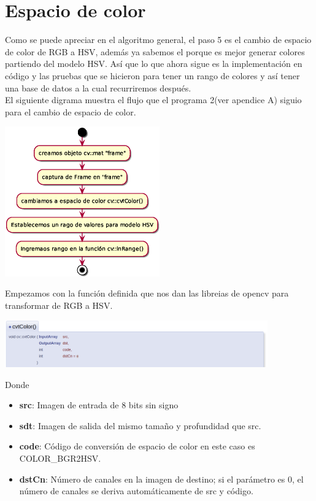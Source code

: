 \section{Espacio de color}
Como se puede apreciar en el algoritmo general, el paso 5 es el cambio de espacio de color
de RGB a HSV, además ya sabemos el porque es mejor generar colores partiendo del
modelo HSV. Así que lo que ahora sigue es la implementación en código y las pruebas
que se hicieron para tener un rango de colores y así tener una base de datos a la
cual recurriremos después.\\
El siguiente digrama muestra el flujo que el programa 2(ver apendice A) siguio para
el cambio de espacio de color.
\begin{center}
	\includegraphics[width=0.5\textwidth]{Contenido/Cuerpo/Capitulo4/color.eps}
	\label{color}
\end{center}
Empezamos con la función definida que nos dan las libreias de opencv para transformar
de RGB a HSV.
\begin{center}
	\includegraphics[width=0.85\textwidth]{Contenido/Cuerpo/Capitulo4/Fig2.eps}
	\label{Fig2}
\end{center}
Donde
\begin{itemize}
	\item \textbf{src}: Imagen de entrada de 8 bits sin signo
	\item \textbf{sdt}: Imagen de salida del mismo tamaño y profundidad que src.
	\item \textbf{code}: Código de conversión de espacio de color en este caso es \\COLOR\_BGR2HSV.
	\item \textbf{dstCn}: Número de canales en la imagen de destino; si el parámetro es 0, el
	      número de canales se deriva automáticamente de src y código.
\end{itemize}

